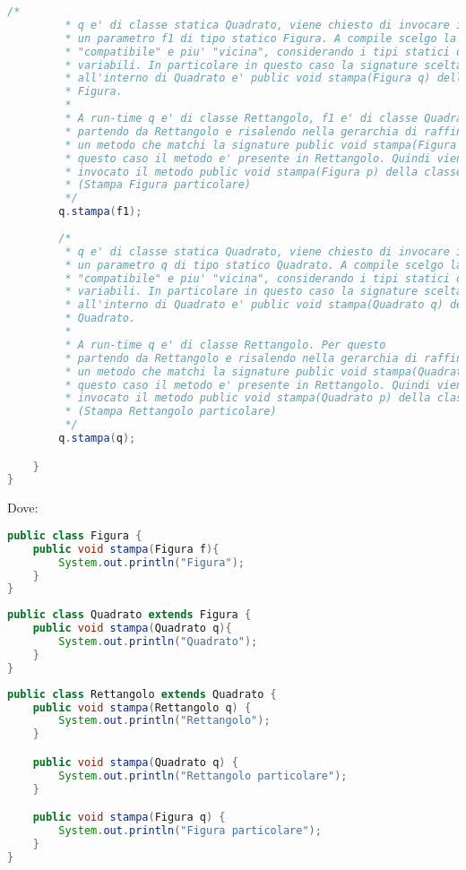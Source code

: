 \documentclass{article}
\begin{document}
\begin{lstlisting}[language=Java,escapechar=|]
		/*
		 * q e' di classe statica Quadrato, viene chiesto di invocare il metodo stampa su
		 * un parametro f1 di tipo statico Figura. A compile scelgo la signature
		 * "compatibile" e piu' "vicina", considerando i tipi statici delle
		 * variabili. In particolare in questo caso la signature scelta
		 * all'interno di Quadrato e' public void stampa(Figura q) della classe
		 * Figura.
		 * 
		 * A run-time q e' di classe Rettangolo, f1 e' di classe Quadrato. Per questo
		 * partendo da Rettangolo e risalendo nella gerarchia di raffinamento cerco
		 * un metodo che matchi la signature public void stampa(Figura p). In
		 * questo caso il metodo e' presente in Rettangolo. Quindi viene
		 * invocato il metodo public void stampa(Figura p) della classe Rettangolo
		 * (Stampa Figura particolare)
		 */
		q.stampa(f1);
		
		/*
		 * q e' di classe statica Quadrato, viene chiesto di invocare il metodo stampa su
		 * un parametro q di tipo statico Quadrato. A compile scelgo la signature
		 * "compatibile" e piu' "vicina", considerando i tipi statici delle
		 * variabili. In particolare in questo caso la signature scelta
		 * all'interno di Quadrato e' public void stampa(Quadrato q) della classe
		 * Quadrato.
		 * 
		 * A run-time q e' di classe Rettangolo. Per questo
		 * partendo da Rettangolo e risalendo nella gerarchia di raffinamento cerco
		 * un metodo che matchi la signature public void stampa(Quadrato p). In
		 * questo caso il metodo e' presente in Rettangolo. Quindi viene
		 * invocato il metodo public void stampa(Quadrato p) della classe Rettangolo
		 * (Stampa Rettangolo particolare)
		 */
		q.stampa(q);

	}
}
\end{lstlisting}

Dove:
\begin{lstlisting}[language=Java,escapechar=|]
public class Figura {
	public void stampa(Figura f){
		System.out.println("Figura");
	}
}
\end{lstlisting}
\begin{lstlisting}[language=Java,escapechar=|]
public class Quadrato extends Figura {
	public void stampa(Quadrato q){
		System.out.println("Quadrato");
	}
}
\end{lstlisting}
\begin{lstlisting}[language=Java,escapechar=|]
public class Rettangolo extends Quadrato {
	public void stampa(Rettangolo q) {
		System.out.println("Rettangolo");
	}

	public void stampa(Quadrato q) {
		System.out.println("Rettangolo particolare");
	}

	public void stampa(Figura q) {
		System.out.println("Figura particolare");
	}
}
\end{lstlisting}
\end{document}
